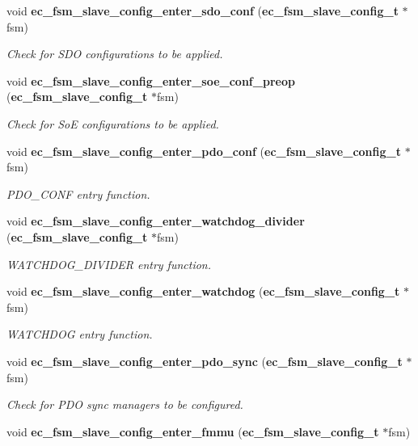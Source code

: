 \begin{DoxyCompactItemize}
void {\bf ec\-\_\-fsm\-\_\-slave\-\_\-config\-\_\-enter\-\_\-sdo\-\_\-conf} ({\bf ec\-\_\-fsm\-\_\-slave\-\_\-config\-\_\-t} $\ast$fsm)
\begin{DoxyCompactList}\small\item\em Check for S\-D\-O configurations to be applied. \end{DoxyCompactList}\item 
void {\bf ec\-\_\-fsm\-\_\-slave\-\_\-config\-\_\-enter\-\_\-soe\-\_\-conf\-\_\-preop} ({\bf ec\-\_\-fsm\-\_\-slave\-\_\-config\-\_\-t} $\ast$fsm)
\begin{DoxyCompactList}\small\item\em Check for So\-E configurations to be applied. \end{DoxyCompactList}\item 
void {\bf ec\-\_\-fsm\-\_\-slave\-\_\-config\-\_\-enter\-\_\-pdo\-\_\-conf} ({\bf ec\-\_\-fsm\-\_\-slave\-\_\-config\-\_\-t} $\ast$fsm)
\begin{DoxyCompactList}\small\item\em P\-D\-O\-\_\-\-C\-O\-N\-F entry function. \end{DoxyCompactList}\item 
void {\bf ec\-\_\-fsm\-\_\-slave\-\_\-config\-\_\-enter\-\_\-watchdog\-\_\-divider} ({\bf ec\-\_\-fsm\-\_\-slave\-\_\-config\-\_\-t} $\ast$fsm)
\begin{DoxyCompactList}\small\item\em W\-A\-T\-C\-H\-D\-O\-G\-\_\-\-D\-I\-V\-I\-D\-E\-R entry function. \end{DoxyCompactList}\item 
void {\bf ec\-\_\-fsm\-\_\-slave\-\_\-config\-\_\-enter\-\_\-watchdog} ({\bf ec\-\_\-fsm\-\_\-slave\-\_\-config\-\_\-t} $\ast$fsm)
\begin{DoxyCompactList}\small\item\em W\-A\-T\-C\-H\-D\-O\-G entry function. \end{DoxyCompactList}\item 
void {\bf ec\-\_\-fsm\-\_\-slave\-\_\-config\-\_\-enter\-\_\-pdo\-\_\-sync} ({\bf ec\-\_\-fsm\-\_\-slave\-\_\-config\-\_\-t} $\ast$fsm)
\begin{DoxyCompactList}\small\item\em Check for P\-D\-O sync managers to be configured. \end{DoxyCompactList}\item 
void {\bf ec\-\_\-fsm\-\_\-slave\-\_\-config\-\_\-enter\-\_\-fmmu} ({\bf ec\-\_\-fsm\-\_\-slave\-\_\-config\-\_\-t} $\ast$fsm)

\end{DoxyCompactItemize}
